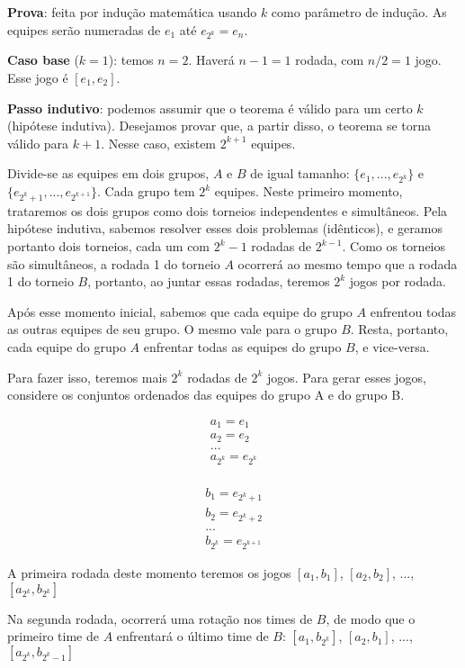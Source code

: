 \textbf{Prova}: feita por indução matemática usando $k$ como parâmetro de indução. As equipes serão numeradas de $e_1$ até $e_{2^k} = e_n$.

\textbf{Caso base} ($k = 1$): temos $n = 2$. Haverá $n-1 = 1$ rodada, com $n/2 = 1$ jogo. Esse jogo é $[e_1, e_2]$.

\textbf{Passo indutivo}: podemos assumir que o teorema é válido para um certo $k$ (hipótese indutiva). Desejamos provar que, a partir disso, o teorema se torna válido para $k+1$. Nesse caso, existem $2^{k+1}$ equipes. 

Divide-se as equipes em dois grupos, $A$ e $B$ de igual tamanho: $\{e_1, ..., e_{2^k}\}$ e $\{e_{2^k+1}, ..., e_{2^{k+1}}\}$. Cada grupo tem $2^k$ equipes. Neste primeiro momento, trataremos os dois grupos como dois torneios independentes e simultâneos. Pela hipótese indutiva, sabemos resolver esses dois problemas (idênticos), e geramos portanto dois torneios, cada um com $2^k - 1$ rodadas de $2^{k - 1}$. Como os torneios são simultâneos, a rodada 1 do torneio $A$ ocorrerá ao mesmo tempo que a rodada 1 do torneio $B$, portanto, ao juntar essas rodadas, teremos $2^k$ jogos por rodada. 

Após esse momento inicial, sabemos que cada equipe do grupo $A$ enfrentou todas as outras equipes de seu grupo. O mesmo vale para o grupo $B$. Resta, portanto, cada equipe do grupo $A$ enfrentar todas as equipes do grupo $B$, e vice-versa.

Para fazer isso, teremos mais $2^k$ rodadas de $2^k$ jogos. Para gerar esses jogos, considere os conjuntos ordenados das equipes do grupo A e do grupo B.

\begin{gather}
a_1 = e_1 \\
a_2 = e_2 \\
... \\
a_{2^k} = e_{2^k} \\
\end{gather}

\begin{gather}
b_1 = e_{2^k + 1} \\
b_2 = e_{2^k + 2} \\
... \\
b_{2^k} = e_{2^{k+1}}
\end{gather}

A primeira rodada deste momento teremos os jogos $[a_1, b_1]$, $[a_2, b_2]$, ..., $[a_{2^k}, b_{2^k}]$

Na segunda rodada, ocorrerá uma rotação nos times de $B$, de modo que o primeiro time de $A$ enfrentará o último time de $B$: $[a_1, b_{2^k}]$, $[a_2, b_1]$, ..., $[a_{2^k}, b_{2^k-1}]$

